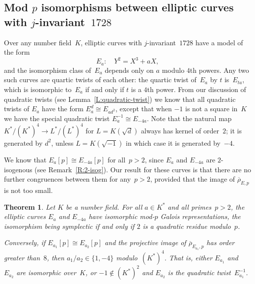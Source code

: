 \documentclass[12pt, reqno]{amsart}
\newcommand{\rhobar}{{\overline{\rho}}}
\numberwithin{equation}{section}
\newtheorem{theorem}{Theorem}[section]
\theoremstyle{definition}
\theoremstyle{remark}
\begin{document}
\subsection{Mod $p$ isomorphisms between elliptic curves with
  $j$-invariant~$1728$}

Over any number field~$K$, elliptic curves with $j$-invariant~$1728$
have a model of the form
\[
E_a:\quad Y^2 = X^3+aX,
\]
and the isomorphism class of~$E_a$ depends only on $a$ modulo $4$th
powers.  Any two such curves are quartic twists of each other: the
quartic twist of~$E_a$ by $t$ is~$E_{ta}$, which is isomorphic
to~$E_a$ if and only if $t$ is a $4$th power.  From our discussion of
quadratic twists (see Lemma~\ref{L:quadratic-twist}) we know that all
quadratic twists of $E_a$ have the form $E_a^d\cong E_{ad^2}$, except
that when $-1$ is not a square in~$K$ we have the special quadratic
twist $E_a^{-1}\cong E_{-4a}$.  Note that the natural map $K^*/(K^*)^4
\to L^*/(L^*)^4$ for $L=K(\sqrt{d})$ always has kernel of order~$2$;
it is generated by $d^2$, unless $L=K(\sqrt{-1})$ in which case it is
generated by~$-4$.


We know that $E_a[p]\cong E_{-4a}[p]$ for all~$p>2$, since $E_a$ and
$E_{-4a}$ are $2$-isogenous (see Remark~\ref{R:2-isog}).  Our result
for these curves is that there are no further congruences between them
for any~$p>2$, provided that the image of $\rhobar_{E,p}$ is not too
small.

\begin{theorem}\label{T:j=1728}
Let $K$ be a number field.  For all $a \in K^*$ and all primes~$p>2$,
the elliptic curves $E_a$ and $E_{-4a}$ have isomorphic mod-$p$ Galois
representations, the isomorphism being symplectic if and only if $2$
is a quadratic residue modulo~$p$.

Conversely, if $E_{a_1}[p]\cong E_{a_2}[p]$ and the projective image
of $\rhobar_{E_{a_1},p}$ has order greater than~$8$, then $a_1/a_2
\in\{1,-4\}$ modulo~$(K^*)^4$.  That is, either $E_{a_1}$
and~$E_{a_2}$ are isomorphic over~$K$, or $-1\notin(K^*)^2$ and
$E_{a_2}$ is the quadratic twist~$E_{a_1}^{-1}$.
\end{theorem}
\end{document}
